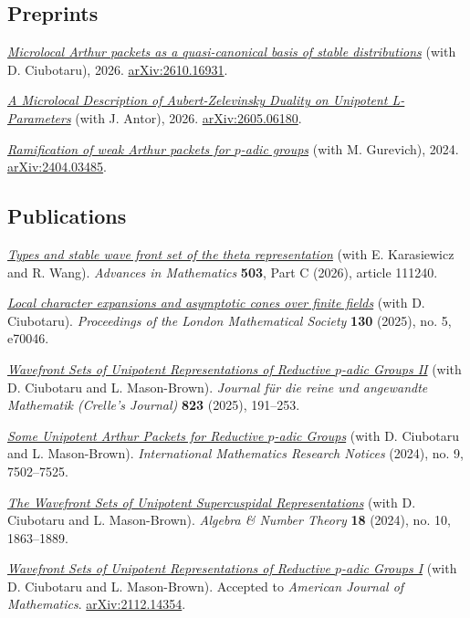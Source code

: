 \documentclass[11pt]{article}
\newenvironment{papers}{\begin{description}[font=\normalfont,labelwidth=1.8em,leftmargin=2.3em,labelsep=0.5em,itemsep=6pt,topsep=2pt,parsep=0pt]\raggedright\interlinepenalty=10000}{\end{description}}
\newcommand{\arxiv}[1]{\href{https://arxiv.org/abs/#1}{arXiv:#1}}
\begin{document}
\subsection*{Preprints}
\begin{papers}
\item[10.] \href{https://arxiv.org/abs/2610.16931}{\textit{Microlocal Arthur packets as a quasi-canonical basis of stable distributions}} (with D. Ciubotaru), 2026. \arxiv{2610.16931}.
\item[9.] \href{https://arxiv.org/abs/2605.06180}{\textit{A Microlocal Description of Aubert-Zelevinsky Duality on Unipotent L-Parameters}} (with J. Antor), 2026. \arxiv{2605.06180}.
\item[8.] \href{https://arxiv.org/abs/2404.03485}{\textit{Ramification of weak Arthur packets for $p$-adic groups}} (with M. Gurevich), 2024. \arxiv{2404.03485}.
\end{papers}

\subsection*{Publications}
\begin{papers}
\item[7.] \href{https://doi.org/10.1016/j.aim.2026.111240}{\textit{Types and stable wave front set of the theta representation}} (with E. Karasiewicz and R. Wang). \textit{Advances in Mathematics} \textbf{503}, Part C (2026), article 111240.
\item[6.] \href{https://doi.org/10.1112/plms.70046}{\textit{Local character expansions and asymptotic cones over finite fields}} (with D. Ciubotaru). \textit{Proceedings of the London Mathematical Society} \textbf{130} (2025), no. 5, e70046.
\item[5.] \href{https://doi.org/10.1515/crelle-2025-0022}{\textit{Wavefront Sets of Unipotent Representations of Reductive $p$-adic Groups II}} (with D. Ciubotaru and L. Mason-Brown). \textit{Journal f\"ur die reine und angewandte Mathematik (Crelle's Journal)} \textbf{823} (2025), 191--253.
\item[4.] \href{https://doi.org/10.1093/imrn/rnad245}{\textit{Some Unipotent Arthur Packets for Reductive $p$-adic Groups}} (with D. Ciubotaru and L. Mason-Brown). \textit{International Mathematics Research Notices} (2024), no. 9, 7502--7525.
\item[3.] \href{https://doi.org/10.2140/ant.2024.18.1863}{\textit{The Wavefront Sets of Unipotent Supercuspidal Representations}} (with D. Ciubotaru and L. Mason-Brown). \textit{Algebra \& Number Theory} \textbf{18} (2024), no. 10, 1863--1889.
\item[2.] \href{https://arxiv.org/abs/2112.14354}{\textit{Wavefront Sets of Unipotent Representations of Reductive $p$-adic Groups I}} (with D. Ciubotaru and L. Mason-Brown). Accepted to \textit{American Journal of Mathematics}. \arxiv{2112.14354}.
\end{papers}
\end{document}
